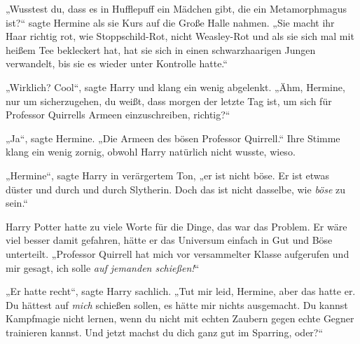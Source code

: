 „Wusstest du, dass es in Hufflepuff ein Mädchen gibt, die ein Metamorphmagus ist?“ sagte Hermine als sie Kurs auf die Große Halle nahmen.
„Sie macht ihr Haar richtig rot, wie Stoppschild-Rot, nicht Weasley-Rot und als sie sich mal mit heißem Tee bekleckert hat, hat sie sich in einen schwarzhaarigen Jungen verwandelt, bis sie es wieder unter Kontrolle hatte.“

„Wirklich? Cool“, sagte Harry und klang ein wenig abgelenkt. „Ähm, Hermine, nur um sicherzugehen, du weißt, dass morgen der letzte Tag ist, um sich für Professor Quirrells Armeen einzuschreiben, richtig?“

„Ja“, sagte Hermine.
„Die Armeen des bösen Professor Quirrell.“ Ihre Stimme klang ein wenig zornig, obwohl Harry natürlich nicht wusste, wieso.

„Hermine“, sagte Harry in verärgertem Ton, „er ist nicht böse. Er ist etwas düster und durch und durch Slytherin. Doch das ist nicht dasselbe, wie \emph{böse} zu sein.“

Harry Potter hatte zu viele Worte für die Dinge, das war das Problem. Er wäre viel besser damit gefahren, hätte er das Universum einfach in Gut und Böse unterteilt.
„Professor Quirrell hat mich vor versammelter Klasse aufgerufen und mir gesagt, ich solle \emph{auf jemanden schießen!}“

„Er hatte recht“, sagte Harry sachlich.
„Tut mir leid, Hermine, aber das hatte er. Du hättest auf \emph{mich} schießen sollen, es hätte mir nichts ausgemacht. Du kannst Kampfmagie nicht lernen, wenn du nicht mit echten Zaubern gegen echte Gegner trainieren kannst. Und jetzt machst du dich ganz gut im Sparring, oder?“

